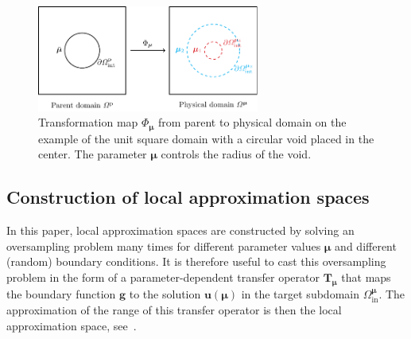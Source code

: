 \documentclass[a4paper]{eccomas_paper-2024}
\newcommand{\m}{\bm\mu}
\begin{document}
%    
\begin{figure}
	\centering
	\includegraphics[width=0.65\textwidth]{transformationmap.pdf}
	\caption{Transformation map $\Phi_{\bm\mu}$ from parent to physical domain on the example of the unit square domain with a circular void placed in the center. The parameter $\bm\mu$ controls the radius of the void.}\label{fig:transformationmap}
\end{figure}


\subsection{Construction of local approximation spaces} %
\label{sub:Construction of local approximation spaces}
In this paper, local approximation spaces are constructed by solving an oversampling problem many times for different parameter values $\bm\mu$ and different (random) boundary conditions.
It is therefore useful to cast this oversampling problem in the form of a parameter-dependent transfer operator $\bm{T}_{\bm\mu}$ that
maps the boundary function $\bm{g}$ to the solution $\bm{u}(\bm\mu)$ in the target subdomain $\varOmega^{\m}_{\mathrm{in}}$.
The approximation of the range of this transfer operator is then the local approximation space, see~\cite{Buhr2018Randomized}.
\end{document}
